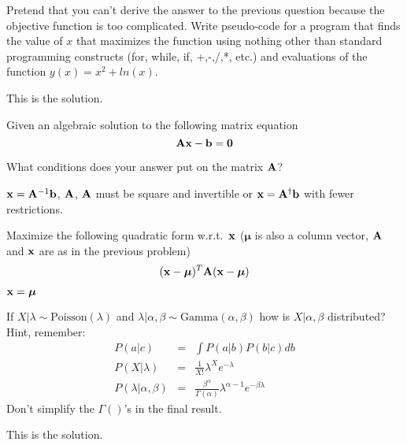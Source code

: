 \documentclass[12pt]{article}
\begin{document}
{
Pretend that you can't derive the answer to the previous question because the objective function is too complicated.  Write pseudo-code for a program that finds the value of $x$ that maximizes the function using nothing other than standard programming constructs (for, while, if, +,-,/,*, etc.) and evaluations of the function $y(x) = x^2+ln(x)$.
}
{
\vspace{3.5in}
\vfill
\newpage

}
{

This is the solution.  
}


{
\abcs
\item
Given an algebraic solution to the following matrix equation
\[ {\bf A} {\bf x} - {\bf b} = {\bf 0}\]
\item
What conditions does your answer put on the matrix ${\bf A}$?
\endabcs
}
{
\vspace{3cm}
\vfill
  \answer
}
{
${\bf x} = {\bf A}^{-1}{\bf b}$, ${\bf A}$, ${\bf A}$ must be square and invertible or ${\bf x} = {\bf A}^\dagger{\bf b}$ with fewer restrictions.
}
\newpage

{
\abcs
\item
Maximize the following quadratic form w.r.t.~${\bf x}$ ($ \boldsymbol{\mu}$ is also a column vector, ${\bf A}$ and $\bf x$ are as in the previous problem)
\[ ({\bf x - \boldsymbol{\mu}})^T{\bf A}( {\bf x -  \boldsymbol{\mu}} )\]
\endabcs
}
{
\vspace{3cm}
\vfill

  \answer
  \newpage
}
{
$\bf x = \boldsymbol{\mu}$
}

{
If $X | \lambda \sim \mathrm{Poisson}(\lambda)$ and $\lambda | \alpha, \beta \sim \mathrm{Gamma}(\alpha, \beta)$ how is $X|\alpha, \beta$ distributed?  Hint, remember:
\begin{eqnarray*}
P(a|c) &=& \int P(a|b) P(b|c) db \\
P(X|\lambda) &=& \frac{1}{X!}\lambda^X e^{-\lambda} \\
P(\lambda|\alpha, \beta) &=& \frac{\beta^\alpha}{\Gamma(\alpha)}\lambda^{\alpha-1} e^{-\beta\lambda} 
\end{eqnarray*}
Don't simplify the $\Gamma()$'s in the final result.
}
{
\vspace{3.5in}
\vfill
\newpage

}
{

This is the solution.  
}
\end{document}
